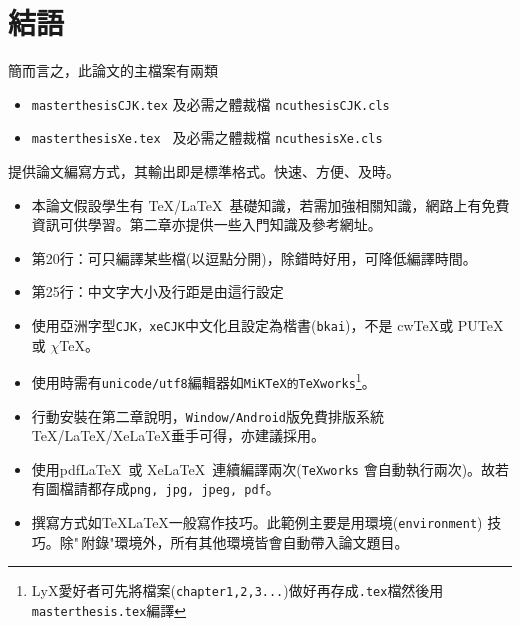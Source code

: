 \section{結語}
簡而言之，此論文的主檔案有兩類
\begin{itemize}
\item {\tt masterthesisCJK.tex} 及必需之體裁檔 {\tt ncuthesisCJK.cls}
\item {\tt masterthesisXe.tex } 及必需之體裁檔 {\tt ncuthesisXe.cls}
\end{itemize}
提供論文編寫方式，其輸出即是標準格式。快速、方便、及時。
\begin{itemize} \index{\TeX!\LaTeX}
\item 本論文假設學生有 \TeX/\LaTeX\ 基礎知識，若需加強相關知識，網路上有免費資訊可供學習。第二章亦提供一些入門知識及參考網址。 

\item 第20行：可只編譯某些檔(以逗點分開)，除錯時好用，可降低編譯時間。

\item 第25行：中文字大小及行距是由這行設定


\item 使用亞洲字型{\tt CJK，xeCJK}中文化且設定為楷書({\tt bkai})，不是 cw\TeX 或 PU\TeX 或 $\chi$\TeX。 

\item 使用時需有{\tt unicode/utf8}編輯器如{\tt MiKTeX的TeXworks}\footnote{LyX愛好者可先將檔案({\tt chapter1,2,3...})做好再存成{\tt .tex}檔然後用{\tt masterthesis.tex}編譯}。  

\item {\color{red}行動安裝}在第二章說明，{\tt Window/Android}版免費排版系統\linebreak \TeX{}/\LaTeX{}/Xe\LaTeX{}垂手可得，亦建議採用。 

\item 使用pdf\LaTeX\ 或 Xe\LaTeX\ 連續編譯兩次({\tt TeXworks} 會自動執行兩次)。故若有圖檔請都存成{\tt png, jpg, jpeg, pdf}。

\item 撰寫方式如\TeX\/\LaTeX{}一般寫作技巧。此範例主要是用環境\linebreak({\tt environment}) 技巧。除"\,附錄"環境外，所有其他環境皆會自動帶入論文題目。\label{indpage}


\end{itemize}
